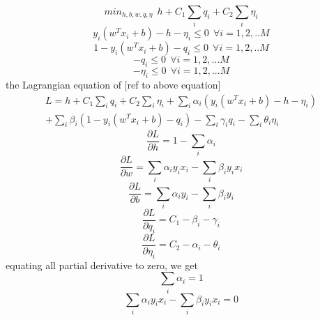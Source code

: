 \begin{equation}\label{mcmeq1}
min_{h,b,w,q,\eta}\:\: h + C_1\sum_i{q_i} + C_2\sum_i{\eta_i}
\end{equation}
\begin{equation}\label{mcmeq2}
y_i(w^Tx_i+b) - h - \eta_i \leq 0 \:\:\forall i={1, 2, .. M}
\end{equation}
\begin{equation}\label{mcmeq3}
1 - y_i(w^Tx_i +b) - q_i \leq 0  \:\:\forall i={1,2,.. M}
\end{equation}
\begin{equation}\label{mcmeq4}
-q_i \leq 0 \:\:\forall i={1, 2, ... M}
\end{equation}
\begin{equation}
-\eta_i \leq 0 \:\:\forall i={1, 2, ... M}
\end{equation}
the Lagrangian equation of [ref to above equation]
\begin{equation}
\begin{split}
L=h + C_1\sum_i{q_i} + C_2\sum_i{\eta_i} + \sum_i{\alpha_i (y_i(w^Tx_i+b) - h - \eta_i)} \\
+ \sum_i{\beta_i (1 - y_i(w^Tx_i +b) - q_i)} - \sum_i{\gamma_iq_i} - \sum_i{\theta_i\eta_i}
\end{split}
\end{equation}
\begin{equation}
\frac{\partial L}{\partial h} = 1 - \sum_i{\alpha_i}
\end{equation}
\begin{equation}
\frac{\partial L}{\partial w} = \sum_i{\alpha_iy_ix_i} - \sum_i{\beta_iy_ix_i}
\end{equation}
\begin{equation}
\frac{\partial L}{\partial b} = \sum_i{\alpha_iy_i} - \sum_i{\beta_iy_i}
\end{equation}
\begin{equation}
\frac{\partial L}{\partial q_i} = C_1 - \beta_i - \gamma_i
\end{equation}
\begin{equation}
\frac{\partial L}{\partial \eta_i} = C_2 - \alpha_i -\theta_i
\end{equation}
equating all partial derivative to zero, we get
\begin{equation}
\sum_i{\alpha_i} = 1
\end{equation}
\begin{equation}
\sum_i{\alpha_iy_ix_i} - \sum_i{\beta_iy_ix_i} = 0
\end{equation}
